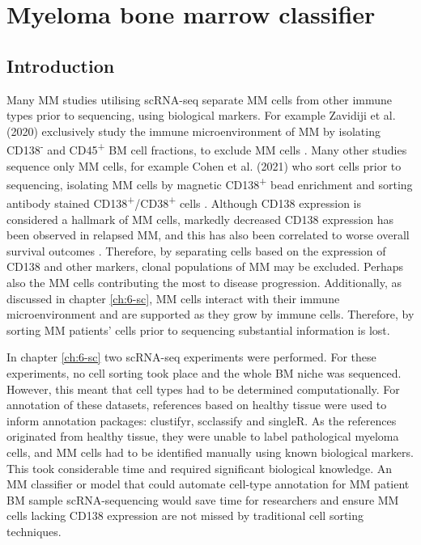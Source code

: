 \section{Myeloma bone marrow classifier}\label{sec:MM_classifier}
\subsection{Introduction}

Many MM studies utilising scRNA-seq separate MM cells from other immune types prior to sequencing, using biological markers.
For example Zavidiji et al. (2020) exclusively study the immune microenvironment of MM by isolating CD138\textsuperscript{-} and CD45\textsuperscript{+} BM cell fractions, to exclude MM cells \cite{zavidij2020single}.
Many other studies sequence only MM cells, for example Cohen et al. (2021) who sort cells prior to sequencing, isolating MM cells by magnetic CD138\textsuperscript{+} bead enrichment and sorting antibody stained CD138\textsuperscript{+}/CD38\textsuperscript{+} cells \cite{cohen2021identification}.
Although CD138 expression is considered a hallmark of MM cells, markedly decreased CD138 expression has been observed in relapsed MM, and this has also been correlated to worse overall survival outcomes \cite{kawano2012multiple}.
Therefore, by separating cells based on the expression of CD138 and other markers, clonal populations of MM may be excluded.
Perhaps also the MM cells contributing the most to disease progression.
Additionally, as discussed in chapter \ref{ch:6-sc}, MM cells interact with their immune microenvironment and are supported as they grow by immune cells.
Therefore, by sorting MM patients' cells prior to sequencing substantial information is lost.

In chapter \ref{ch:6-sc} two scRNA-seq experiments were performed.
For these experiments, no cell sorting took place and the whole BM niche was sequenced.
However, this meant that cell types had to be determined computationally.
For annotation of these datasets, references based on healthy tissue were used to inform annotation packages: clustifyr, scclassify and singleR.
As the references originated from healthy tissue, they were unable to label pathological myeloma cells, and MM cells had to be identified manually using known biological markers.
This took considerable time and required significant biological knowledge.
An MM classifier or model that could automate cell-type annotation for MM patient BM sample scRNA-sequencing would save time for researchers and ensure MM cells lacking CD138 expression are not missed by traditional cell sorting techniques.

